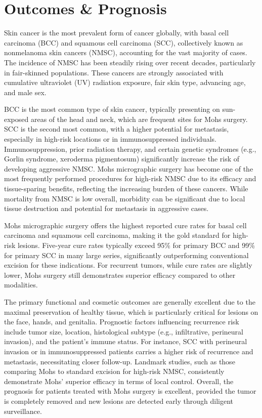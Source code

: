 \section*{Outcomes \& Prognosis}
Skin cancer is the most prevalent form of cancer globally, with basal cell carcinoma (BCC) and squamous cell carcinoma (SCC), collectively known as nonmelanoma skin cancers (NMSC), accounting for the vast majority of cases. The incidence of NMSC has been steadily rising over recent decades, particularly in fair-skinned populations. These cancers are strongly associated with cumulative ultraviolet (UV) radiation exposure, fair skin type, advancing age, and male sex. 

BCC is the most common type of skin cancer, typically presenting on sun-exposed areas of the head and neck, which are frequent sites for Mohs surgery. SCC is the second most common, with a higher potential for metastasis, especially in high-risk locations or in immunosuppressed individuals. Immunosuppression, prior radiation therapy, and certain genetic syndromes (e.g., Gorlin syndrome, xeroderma pigmentosum) significantly increase the risk of developing aggressive NMSC. Mohs micrographic surgery has become one of the most frequently performed procedures for high-risk NMSC due to its efficacy and tissue-sparing benefits, reflecting the increasing burden of these cancers. While mortality from NMSC is low overall, morbidity can be significant due to local tissue destruction and potential for metastasis in aggressive cases.

Mohs micrographic surgery offers the highest reported cure rates for basal cell carcinoma and squamous cell carcinoma, making it the gold standard for high-risk lesions. Five-year cure rates typically exceed 95\% for primary BCC and 99\% for primary SCC in many large series, significantly outperforming conventional excision for these indications. For recurrent tumors, while cure rates are slightly lower, Mohs surgery still demonstrates superior efficacy compared to other modalities. 

The primary functional and cosmetic outcomes are generally excellent due to the maximal preservation of healthy tissue, which is particularly critical for lesions on the face, hands, and genitalia. Prognostic factors influencing recurrence risk include tumor size, location, histological subtype (e.g., infiltrative, perineural invasion), and the patient's immune status. For instance, SCC with perineural invasion or in immunosuppressed patients carries a higher risk of recurrence and metastasis, necessitating closer follow-up. Landmark studies, such as those comparing Mohs to standard excision for high-risk NMSC, consistently demonstrate Mohs' superior efficacy in terms of local control. Overall, the prognosis for patients treated with Mohs surgery is excellent, provided the tumor is completely removed and new lesions are detected early through diligent surveillance.

